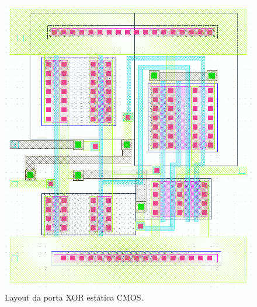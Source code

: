 \documentclass[a4paper,10pt] {article}
\begin{document}
\begin{figure}[h]
  \begin{minipage} [b] {0.48 \linewidth}
	\centering
	\includegraphics[scale=0.2]{xorStaticCMOSlayout.png}
	\caption{Layout da porta XOR estática CMOS.}
	\label{fig:xorStaticLayout}
  \end{minipage}
  \begin{minipage} [b] {0.48 \linewidth}
	\centering

\end{minipage}
\end{figure}
\end{document}
